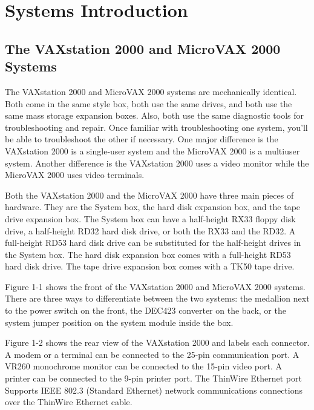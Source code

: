 \documentclass{decsectional}
\begin{document}
\newpage
\pagestyle{main}
\chapter{Systems Introduction}
\section{The VAXstation 2000 and MicroVAX 2000 Systems}

The VAXstation 2000 and MicroVAX 2000 systems are mechanically
identical. Both come in the same style box, both use the same drives,
and both use the same mass storage expansion boxes. Also, both use
the same diagnostic tools for troubleshooting and repair. Once familiar
with troubleshooting one system, you'll be able to troubleshoot the other
if necessary. One major difference is the VAXstation 2000 is a single-user
system and the MicroVAX 2000 is a multiuser system. Another difference
is the VAXstation 2000 uses a video monitor while the MicroVAX 2000 uses
video terminals.

Both the VAXstation 2000 and the MicroVAX 2000 have three main pieces
of hardware. They are the System box, the hard disk expansion box, and
the tape drive expansion box. The System box can have a half-height RX33
floppy disk drive, a half-height RD32 hard disk drive, or both the RX33 and
the RD32. A full-height RD53 hard disk drive can be substituted for the 
half-height drives in the System box. The hard disk expansion box comes with a
full-height RD53 hard disk drive. The tape drive expansion box comes with
a TK50 tape drive.

\newpage

Figure 1-1 shows the front of the VAXstation 2000 and MicroVAX 2000
systems. There are three ways to differentiate between the two systems:
the medallion next to the power switch on the front, the DEC423 converter
on the back, or the system jumper position on the system module inside
the box.


\newpage
Figure 1-2 shows the rear view of the VAXstation 2000 and labels each
connector. A modem or a terminal can be connected to the 25-pin 
communication port. A VR260 monochrome monitor can be connected to the
15-pin video port. A printer can be connected to the 9-pin printer port. The
ThinWire Ethernet port Supports IEEE 802.3 (Standard Ethernet) network
communications connections over the ThinWire Ethernet cable.
\end{document}
